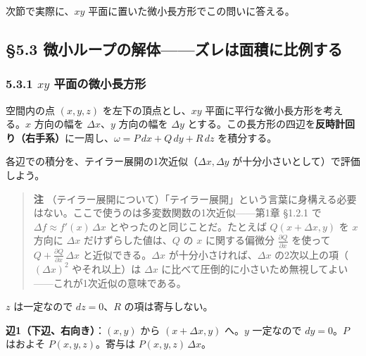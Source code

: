 \documentclass[a4paper,12pt,openany]{book}
\begin{document}
次節で実際に、\(xy\) 平面に置いた微小長方形でこの問いに答える。

\par\vspace{0.35em}\par

\hypertarget{ux5faeux5c0fux30ebux30fcux30d7ux306eux89e3ux4f53ux30baux30ecux306fux9762ux7a4dux306bux6bd4ux4f8bux3059ux308b}{%
\subsection{§5.3
微小ループの解体——ズレは面積に比例する}\label{ux5faeux5c0fux30ebux30fcux30d7ux306eux89e3ux4f53ux30baux30ecux306fux9762ux7a4dux306bux6bd4ux4f8bux3059ux308b}}

\hypertarget{xy-ux5e73ux9762ux306eux5faeux5c0fux9577ux65b9ux5f62}{%
\subsubsection{\texorpdfstring{5.3.1 \(xy\)
平面の微小長方形}{5.3.1 xy 平面の微小長方形}}\label{xy-ux5e73ux9762ux306eux5faeux5c0fux9577ux65b9ux5f62}}

空間内の点 \((x, y, z)\) を左下の頂点とし、\(xy\)
平面に平行な微小長方形を考える。\(x\) 方向の幅を \(\Delta x\)、\(y\)
方向の幅を \(\Delta y\)
とする。この長方形の四辺を\textbf{反時計回り（右手系）}に一周し、\(\omega = P\,dx + Q\,dy + R\,dz\)
を積分する。

各辺での積分を、テイラー展開の1次近似（\(\Delta x, \Delta y\)
が十分小さいとして）で評価しよう。

\begin{quote}
\textbf{注}
（テイラー展開について）「テイラー展開」という言葉に身構える必要はない。ここで使うのは多変数関数の1次近似——第1章
§1.2.1 で \(\Delta f \approx f'(x)\,\Delta x\)
とやったのと同じことだ。たとえば \(Q(x+\Delta x, y)\) を \(x\) 方向に
\(\Delta x\) だけずらした値は、\(Q\) の \(x\) に関する偏微分
\(\frac{\partial Q}{\partial x}\) を使って
\(Q + \frac{\partial Q}{\partial x}\,\Delta x\)
と近似できる。\(\Delta x\) が十分小さければ、\(\Delta x\)
の2次以上の項（\((\Delta x)^2\) やそれ以上）は \(\Delta x\)
に比べて圧倒的に小さいため無視してよい——これが1次近似の意味である。
\end{quote}

\(z\) は一定なので \(dz=0\)、\(R\) の項は寄与しない。

\textbf{辺1（下辺、右向き）}：\((x, y)\) から \((x+\Delta x, y)\)
へ。\(y\) 一定なので \(dy=0\)。\(P\) はおよそ \(P(x, y, z)\)。寄与は
\(P(x, y, z)\,\Delta x\)。
\end{document}

